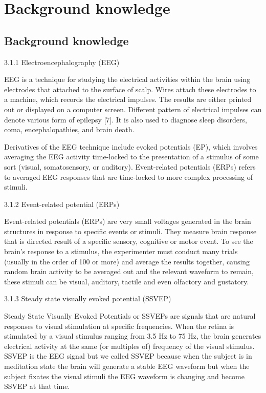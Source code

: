\chapter{Background knowledge}

\label{ch:Background knowledge}

\setlength{\parindent}{4em}
\setlength{\parskip}{1em}
\renewcommand{\baselinestretch}{1.5}

\section{Background knowledge}

\hspace{1.5cm} 3.1.1 Electroencephalography (EEG)

EEG is a technique for studying the electrical activities within the brain using electrodes that attached to the surface of scalp. Wires attach these electrodes to a machine, which records the electrical impulses. The results are either printed out or displayed on a computer screen. Different pattern of electrical impulses can denote various form of epilepsy [7]. It is also used to diagnose sleep disorders, coma, encephalopathies, and brain death.\par
Derivatives of the EEG technique include evoked potentials (EP), which involves averaging the EEG activity time-locked to the presentation of a stimulus of some sort (visual, somatosensory, or auditory). Event-related potentials (ERPs) refers to averaged EEG responses that are time-locked to more complex processing of stimuli.

3.1.2 Event-related potential (ERPs)

Event-related potentials (ERPs) are very small voltages generated in the brain structures in response to specific events or stimuli. They measure brain response that is directed result of a specific sensory, cognitive or motor event. To see the brain's response to a stimulus, the experimenter must conduct many trials (usually in the order of 100 or more) and average the results together, causing random brain activity to be averaged out and the relevant waveform to remain, these stimuli can be visual, auditory, tactile and even olfactory and gustatory.\par

3.1.3 Steady state visually evoked potential (SSVEP)

Steady State Visually Evoked Potentials or SSVEPs are signals that are natural responses to visual stimulation at specific frequencies. When the retina is stimulated by a visual stimulus ranging from 3.5 Hz to 75 Hz, the brain generates electrical activity at the same (or multiples of) frequency of the visual stimulus. SSVEP is the EEG signal but we called SSVEP because when the subject is in meditation state the brain will generate a stable EEG waveform but when the subject fixates the visual stimuli the EEG waveform is changing and become SSVEP at that time.\par

